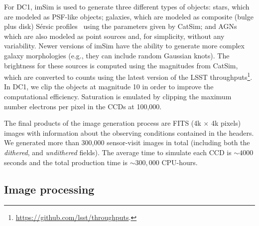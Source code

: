 \documentclass[a4paper,fleqn,usenatbib]{mnras}
\begin{document}
For DC1, imSim is used to generate three different types of objects: stars, which are modeled as PSF-like objects; galaxies, which are modeled as composite (bulge plus disk) S\'{e}rsic profiles~\citep{1963BAAA....6...41S} using
the parameters given by CatSim; and AGNs which are also modeled as point sources and, for simplicity, without any variability. Newer versions of imSim have the ability to generate more complex galaxy morphologies (e.g., they can include random Gaussian knots). The brightness for these sources is computed using the magnitudes from CatSim, which are converted to counts using the latest version of the LSST throughputs\footnote{\url{https://github.com/lsst/throughputs}.}. In DC1, we clip the objects at magnitude 10 in order to improve the computational efficiency. Saturation is emulated by clipping the maximum number electrons per pixel in the CCDs at 100,000.

The final products of the image generation process are FITS (4k $\times$ 4k pixels) images with information about the observing conditions contained in the headers. We generated more than 300,000 sensor-visit images in total (including both the \textit{dithered}, and \textit{undithered} fields). The average time to simulate each CCD is $\sim 4000$ seconds and the total production time is $\sim 300,000$ CPU-hours.

\subsection{Image processing}
\label{sec:image_processing_pipeline}
\end{document}
